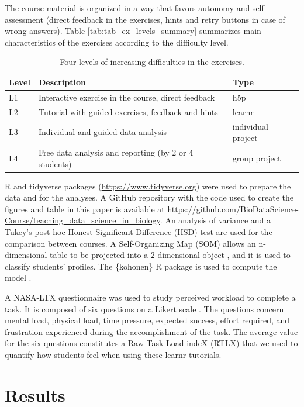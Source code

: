 \documentclass{aims}
\theoremstyle{definition}
\begin{document}
The course material is organized in a way that favors autonomy and
self-assessment (direct feedback in the exercises, hints and retry
buttons in case of wrong answers). Table
\ref {tab:tab_ex_levels_summary} summarizes main characteristics of the
exercises according to the difficulty level.

\begin{table}

\caption{\label{tab:tab_ex_levels_summary}\label{tab:tab_ex_levels} Four levels of increasing difficulties in the exercises.}
\centering
\begin{tabular}[t]{l|l|l}
\hline
Level & Description & Type\\
\hline
L1 & Interactive exercise in the course, direct feedback & h5p\\
\hline
L2 & Tutorial with guided exercises, feedback and hints & learnr\\
\hline
L3 & Individual and guided data analysis & individual project\\
\hline
L4 & Free data analysis and reporting (by 2 or 4 students) & group project\\
\hline
\end{tabular}
\end{table}

R and tidyverse \cite{Wickham2019} packages
(\url{https://www.tidyverse.org}) were used to prepare the data and for
the analyses. A GitHub repository with the code used to create the
figures and table in this paper is available at
\url{https://github.com/BioDataScience-Course/teaching_data_science_in_biology}.
An analysis of variance and a Tukey's post-hoc Honest Significant
Difference (HSD) test are used for the comparison between courses. A
Self-Organizing Map (SOM) allows an n-dimensional table to be projected
into a 2-dimensional object \cite{Kohonen1995}, and it is used to
classify students' profiles. The \{kohonen\} R package is used to
compute the model \cite{Wehrens2018}.

A NASA-LTX questionnaire was used to study perceived workload to
complete a task. It is composed of six questions on a Likert scale
\cite{Hart1988}. The questions concern mental load, physical load, time
pressure, expected success, effort required, and frustration experienced
during the accomplishment of the task. The average value for the six
questions constitutes a Raw Task Load indeX (RTLX) \cite{Byers1989} that
we used to quantify how students feel when using these learnr tutorials.

\hypertarget{results}{%
\section{Results}\label{results}}
\end{document}
